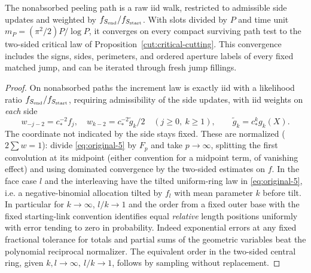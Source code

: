 \begin{lemma}\label{cut:raw-walk}
The nonabsorbed peeling path is a raw iid walk, restricted to admissible
side updates and weighted by \(f_{S_{\rm end}}/f_{S_{\rm start}}\).
With slots divided by \(P\) and time unit
\(m_P=(\pi^2/2)P/\log P\), it converges on every compact surviving path test
to the two-sided critical law of Proposition~\ref{cut:critical-cutting}.
This convergence includes the signs, sides, perimeters, and ordered aperture
labels of every fixed matched jump, and can be iterated through fresh jump
fillings.
\end{lemma}
\begin{proof}\leavevmode

On nonabsorbed paths the increment law is exactly iid with a likelihood ratio \(f_{S_{\rm end}}/f_{S_{\rm start}}\), requiring admissibility of the side updates, with iid weights on \emph{each} side
\begin{equation}\label{eq:original-12}
w_{-j-2}=c_*^{-2} f_j,\quad
 w_{k-2}=c_*^{-2}\widetilde g_k/2 \quad(j\ge0,\ k\ge1),
 \qquad \widetilde g_k=c_*^k g_k(X).
\end{equation}
The coordinate not indicated by the side stays fixed.
These are normalized (\(2\sum w=1\)): divide \eqref{eq:original-5} by \(F_p\) and take \(p\to\infty\), splitting the first convolution at its midpoint (either convention for a midpoint term, of vanishing effect) and using dominated convergence by the two-sided estimates on \(f\).
In the face case \(l\) and the interleaving have the tilted uniform-ring law in \eqref{eq:original-5}, i.e. a negative-binomial allocation tilted by \(f_l\) with mean parameter \(k\) before tilt.
In particular for \(k\to\infty\), \(l/k\to1\) and the order from a fixed outer base with the fixed starting-link convention identifies equal \emph{relative} length positions uniformly with error tending to zero in probability.
Indeed exponential errors at any fixed fractional tolerance for totals and partial sums of the geometric variables beat the polynomial reciprocal normalizer.
The equivalent order in the two-sided central ring, given \(k,l\to\infty,\ l/k\to1\), follows by sampling without replacement.


\end{proof}
